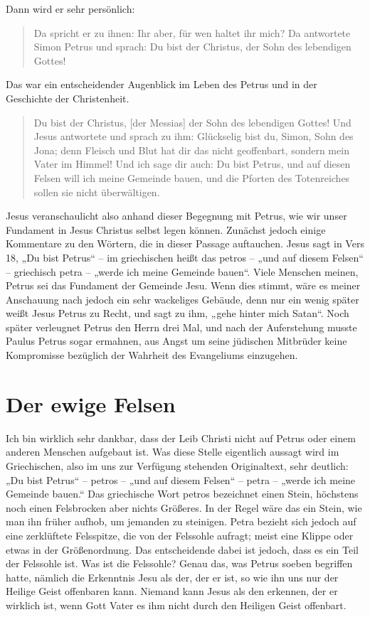 Dann wird er sehr persönlich:

\begin{quotation}
  Da spricht er zu ihnen: Ihr aber, für wen haltet ihr mich? 
  Da antwortete Simon Petrus und sprach: Du bist der Christus, der Sohn des lebendigen Gottes!
\end{quotation}

Das war ein entscheidender Augenblick im Leben des Petrus und in der Geschichte der Christenheit.

\begin{quotation}
  Du bist der Christus, [der Messias] der Sohn des lebendigen Gottes! 
  Und Jesus antwortete und sprach zu ihm: Glückselig bist du, Simon, Sohn des Jona; denn Fleisch und Blut hat dir das nicht geoffenbart, sondern mein Vater im Himmel!
  Und ich sage dir auch: Du bist Petrus, und auf diesen Felsen will ich meine Gemeinde bauen, und die Pforten des Totenreiches sollen sie nicht überwältigen.
\end{quotation}

Jesus veranschaulicht also anhand dieser Begegnung mit Petrus, wie wir unser Fundament in Jesus Christus selbst legen können. 
Zunächst jedoch einige Kommentare zu den Wörtern, die in dieser Passage auftauchen. 
Jesus sagt in Vers 18, „Du bist Petrus“ – im griechischen heißt das petros – „und auf diesem Felsen“ – griechisch petra – „werde ich meine Gemeinde bauen“.
Viele Menschen meinen, Petrus sei das Fundament der Gemeinde Jesu. Wenn dies stimmt, wäre es meiner Anschauung nach jedoch ein sehr wackeliges Gebäude, denn nur ein wenig später weißt Jesus Petrus zu Recht, und sagt zu ihm, „gehe hinter mich Satan“.
Noch später verleugnet Petrus den Herrn drei Mal, und nach der Auferstehung musste Paulus Petrus sogar ermahnen, aus Angst um seine jüdischen Mitbrüder keine Kompromisse bezüglich der Wahrheit des Evangeliums einzugehen.

\section{Der ewige Felsen}

Ich bin wirklich sehr dankbar, dass der Leib Christi nicht auf Petrus oder einem anderen Menschen aufgebaut ist. 
Was diese Stelle eigentlich aussagt wird im Griechischen, also im uns zur Verfügung stehenden Originaltext, sehr deutlich: „Du bist Petrus“ – petros – „und auf diesem Felsen“ – petra – „werde ich meine Gemeinde bauen.“
Das griechische Wort petros bezeichnet einen Stein, höchstens noch einen Felsbrocken aber nichts Größeres.
In der Regel wäre das ein Stein, wie man ihn früher aufhob, um jemanden zu steinigen.
Petra bezieht sich jedoch auf eine zerklüftete Felsspitze, die von der Felssohle aufragt; meist eine Klippe oder etwas in der Größenordnung.
Das entscheidende dabei ist jedoch, dass es ein Teil der Felssohle ist. Was ist die Felssohle?
Genau das, was Petrus soeben begriffen hatte, nämlich die Erkenntnis Jesu als der, der er ist, so wie ihn uns nur der Heilige Geist offenbaren kann.
Niemand kann Jesus als den erkennen, der er wirklich ist, wenn Gott Vater es ihm nicht durch den Heiligen Geist offenbart.


